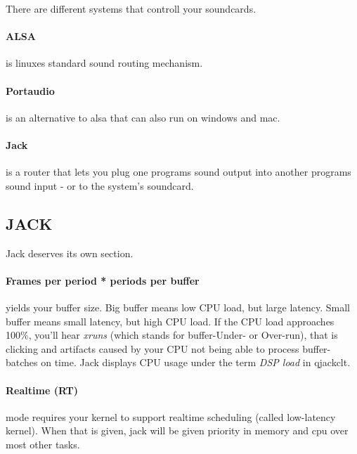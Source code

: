 There are different systems that controll your soundcards. 


\paragraph{ALSA} is linuxes standard sound routing mechanism. 

\paragraph{Portaudio} is an alternative to alsa that can also run on windows and mac. 

\paragraph{Jack} is a router that lets you plug one programs sound output into another programs sound input - or to the system's soundcard. 

\subsection{JACK}
Jack deserves its own section. 

\paragraph{Frames per period * periods per buffer} yields your buffer size. Big buffer means low CPU load, but large latency. Small buffer means small latency, but high CPU load. If the CPU load approaches 100\%, you'll hear \emph{xruns} (which stands for buffer-Under- or Over-run), that is clicking and artifacts caused by your CPU not being able to process buffer-batches on time. Jack displays CPU usage under the term \emph{DSP load} in qjackclt.

\paragraph{Realtime (RT)} mode requires your kernel to support realtime scheduling (called low-latency kernel). When that is given, jack will be given priority in memory and cpu over most other tasks. 
